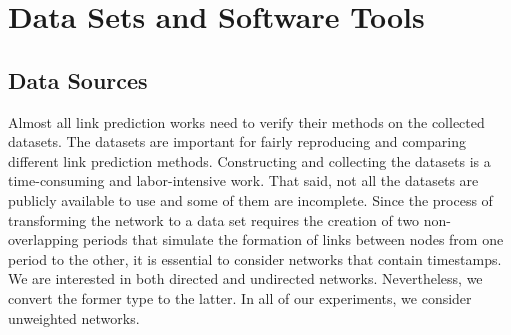 \documentclass{acm_proc_article-sp}
\begin{document}

\section{Data Sets and Software Tools}
\label{Sect.5}
\subsection{Data Sources}
Almost all link prediction works need to verify their methods on the collected datasets. The datasets are important for fairly reproducing and comparing different link prediction methods. Constructing and collecting the datasets is a time-consuming and labor-intensive work. That said, not all the datasets are publicly available to use and some of them are incomplete. Since the process of transforming the network to a data set requires the creation of two non-overlapping periods that simulate the formation of links between nodes from one period to the other, it is essential to consider networks that contain timestamps. We are interested in both directed and undirected networks. Nevertheless, we convert the former type to the latter. In all of our experiments, we consider unweighted networks.


\end{document}

